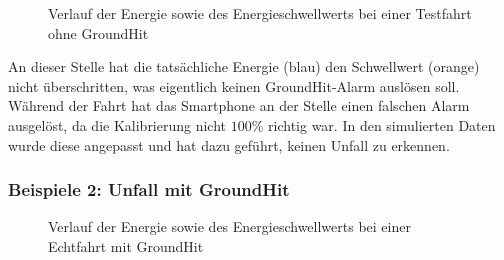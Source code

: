 \begin{figure}
	\centering
	\caption{Verlauf der Energie sowie des Energieschwellwerts bei einer Testfahrt ohne GroundHit}
	\label{fig:GH_Testfahrt_noGroundHit_EnergyZoomed}
\end{figure}


An dieser Stelle hat die tatsächliche Energie (blau) den Schwellwert (orange) nicht überschritten, was eigentlich keinen GroundHit-Alarm auslösen soll. Während der Fahrt hat das Smartphone an der Stelle einen falschen Alarm ausgelöst, da die Kalibrierung nicht $100\%$ richtig war. In den simulierten Daten wurde diese angepasst und hat dazu geführt, keinen Unfall zu erkennen.

\subsubsection{Beispiele 2: Unfall mit GroundHit}


\begin{figure}
	\centering
	\caption{Verlauf der Energie sowie des Energieschwellwerts bei einer Echtfahrt mit GroundHit}
	\label{fig:RealcrashID_2806_EnergyZoomed_MitGroundHit}
\end{figure}



